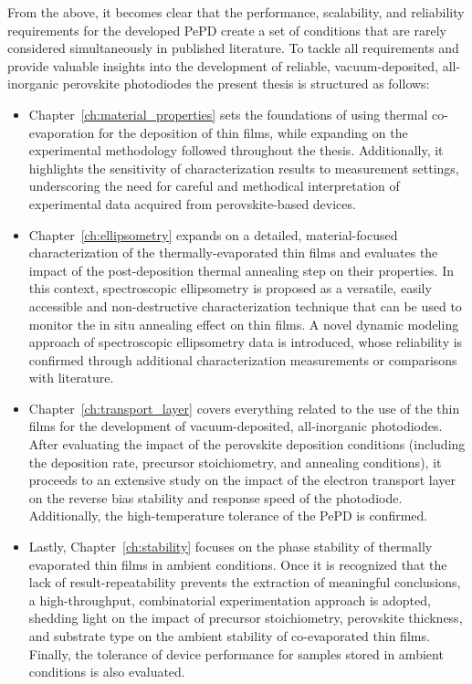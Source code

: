 From the above, it becomes clear that the performance, scalability, and reliability requirements for the developed PePD create a set of conditions that are rarely considered simultaneously in published literature. To tackle all requirements and provide valuable insights into the development of reliable, vacuum-deposited, all-inorganic perovskite photodiodes the present thesis is structured as follows:  

\begin{itemize}

    \item Chapter~\ref{ch:material_properties} sets the foundations of using thermal co-evaporation for the deposition of  thin films, while expanding on the experimental methodology followed throughout the thesis. Additionally, it highlights the sensitivity of characterization results to measurement settings, underscoring the need for careful and methodical interpretation of experimental data acquired from perovskite-based devices.

    \item Chapter~\ref{ch:ellipsometry} expands on a detailed, material-focused characterization of the thermally-evaporated  thin films and evaluates the impact of the post-deposition thermal annealing step on their properties. In this context, spectroscopic ellipsometry is proposed as a versatile, easily accessible and non-destructive characterization technique that can be used to monitor the in situ annealing effect on  thin films. A novel dynamic modeling approach of spectroscopic ellipsometry data is introduced, whose reliability is confirmed through additional characterization measurements or comparisons with literature. 

    \item Chapter~\ref{ch:transport_layer} covers everything related to the use of the  thin films for the development of vacuum-deposited, all-inorganic photodiodes. After evaluating the impact of the perovskite deposition conditions (including the deposition rate, precursor stoichiometry, and annealing conditions), it proceeds to an extensive study on the impact of the electron transport layer on the reverse bias stability and response speed of the photodiode. Additionally, the high-temperature tolerance of the PePD is confirmed.

    \item  Lastly, Chapter~\ref{ch:stability} focuses on the phase stability of thermally evaporated  thin films in ambient conditions. Once it is recognized that the lack of result-repeatability prevents the extraction of meaningful conclusions, a high-throughput, combinatorial experimentation approach is adopted, shedding light on the impact of precursor stoichiometry, perovskite thickness, and substrate type on the ambient stability of co-evaporated  thin films. Finally, the tolerance of device performance for samples stored in ambient conditions is also evaluated. 
    
\end{itemize}







\cleardoublepage

